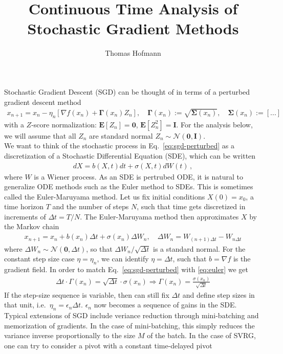 \documentclass{article}
\author{Thomas Hofmann}
\title{Continuous Time Analysis of \\ Stochastic Gradient Methods}
\newcommand{\E}{{\mathbf E}}
\newcommand{\mSigma}{{\mathbf \Sigma}}
\newcommand{\mGamma}{{\mathbf \Gamma}}
\newcommand{\mI}{{\mathbf I}}
\begin{document}
\maketitle 

Stochastic Gradient Descent (SGD) can be thought of in terms of a perturbed gradient descent method
\begin{align}
x_{n+1}= x_n - \eta_n \left[ \nabla f(x_n) + \mGamma(x_n) Z_n \right],  \quad 
	\mGamma(x_n) := \sqrt{\mSigma(x_n)}, \quad 
	\mSigma(x_n) := [...]		
\label{eq:sgd-perturbed}
\end{align}
with a  $Z$-score normalization: $\E[Z_n]=\mathbf 0$, $\E[Z_n^2]=\mI$. For the analysis below, we will assume that all $Z_n$ are standard normal $Z_n \sim \mathcal N(\mathbf 0, \mI)$. \\

We want to think of the  stochastic process in Eq.~\eqref{eq:sgd-perturbed} as a discretization of a Stochastic Differential Equation (SDE), which can be written 
\begin{align}
dX = b(X,t) dt + \sigma(X,t) dW(t)\,,
\label{eq:sde}
\end{align}
where $W$ is a Wiener process. As an SDE is pertrubed ODE, it is natural to generalize ODE methods such as the Euler method to SDEs. This is sometimes called the Euler-Maruyama method. Let us fix initial conditions $X(0) = x_0$, a time horizon $T$ and the number of steps $N$, such that time gets discretized in increments of $\Delta t = T/N$. The Euler-Maruyama method then approximates $X$ by the Markov chain 
\begin{align}
x_{n+1} = x_n + b(x_n) \Delta t   + \sigma(x_n) \Delta W_n, \quad \Delta W_{n}=W_{(n+1)\Delta t}-W_{n \Delta t}
\label{eq:euler}
\end{align} 
where $\Delta W_n \sim \mathcal N(\mathbf 0, \Delta t)$, so that $\Delta W_n/ \sqrt{\Delta t}$ is a standard normal. For the constant step size case $\eta = \eta_n$, we can identify $\eta = \Delta t$, such that $b = \nabla f$ is the gradient field. In order to match Eq.~\eqref{eq:sgd-perturbed} with \eqref{eq:euler}  we get 
\begin{align}
\Delta t \cdot \Gamma(x_n) = \sqrt{\Delta t} \cdot \sigma(x_n)  \Rightarrow \Gamma(x_n)  = \frac{\sigma(x_n)}{\sqrt{\Delta t}}
\end{align}
If the step-size sequence is variable, then can still fix $\Delta t$ and define step sizes in that unit, i.e.~$\eta_n = \epsilon_n \Delta t$. $\epsilon_n$ now becomes a sequence of gains in the SDE. \\

Typical extensions of SGD include veriance reduction through mini-batching and memorization of gradients. In the case of mini-batching, this simply reduces the variance inverse proportionally to the size $M$ of the batch. In the case of SVRG, one can try to consider a pivot with a constant time-delayed pivot 

\end{document}
